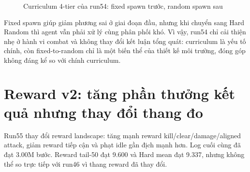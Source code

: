 \begin{figure}[H]
    \centering
    \caption{Curriculum 4-tier của run54: fixed spawn trước, random spawn sau}
    \label{fig:run54_four_tier}
\end{figure}

Fixed spawn giúp giảm phương sai ở giai đoạn đầu, nhưng khi chuyển sang Hard Random thì agent vẫn phải xử lý cùng phân phối khó. Vì vậy, run54 chỉ cải thiện nhẹ ở hành vi combat và không thay đổi kết luận tổng quát: curriculum là yếu tố chính, còn fixed-to-random chỉ là một biến thể của thiết kế môi trường, đóng góp không đáng kể so với chính curriculum.

\section{Reward v2: tăng phần thưởng kết quả nhưng thay đổi thang đo}

Run55 thay đổi reward landscape: tăng mạnh reward kill/clear/damage/aligned attack, giảm reward tiếp cận và phạt idle gần địch mạnh hơn. Log cuối cùng đã đạt 3.00M bước. Reward tail-50 đạt 9.600 và Hard mean đạt 9.337, nhưng không thể so trực tiếp với run46 vì thang reward đã thay đổi.

